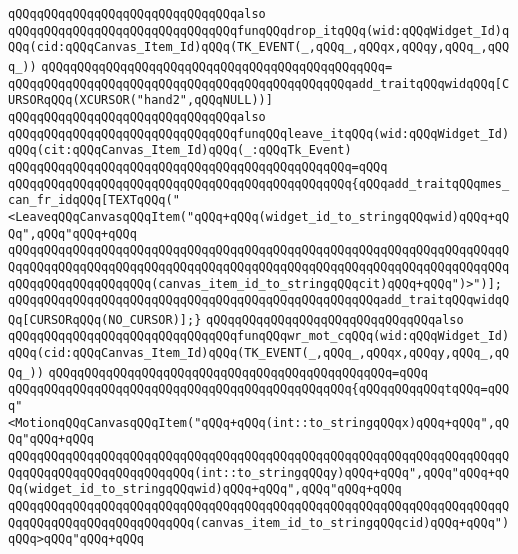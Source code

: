 \verb|qQQqqQQqqQQqqQQqqQQqqQQqqQQqqQQqalso|\newline
\verb|qQQqqQQqqQQqqQQqqQQqqQQqqQQqqQQqfunqQQqdrop_itqQQq(wid:qQQqWidget_Id)qQQq(cid:qQQqCanvas_Item_Id)qQQq(TK_EVENT(_,qQQq_,qQQqx,qQQqy,qQQq_,qQQq_))|\newline
\verb|qQQqqQQqqQQqqQQqqQQqqQQqqQQqqQQqqQQqqQQqqQQqqQQq=|\newline
\verb|qQQqqQQqqQQqqQQqqQQqqQQqqQQqqQQqqQQqqQQqqQQqqQQqadd_traitqQQqwidqQQq[CURSORqQQq(XCURSOR("hand2",qQQqNULL))]|\newline
\newline
\verb|qQQqqQQqqQQqqQQqqQQqqQQqqQQqqQQqalso|\newline
\verb|qQQqqQQqqQQqqQQqqQQqqQQqqQQqqQQqfunqQQqleave_itqQQq(wid:qQQqWidget_Id)qQQq(cit:qQQqCanvas_Item_Id)qQQq(_:qQQqTk_Event)|\newline
\verb|qQQqqQQqqQQqqQQqqQQqqQQqqQQqqQQqqQQqqQQqqQQqqQQq=qQQq|\newline
\verb|qQQqqQQqqQQqqQQqqQQqqQQqqQQqqQQqqQQqqQQqqQQqqQQq{qQQqadd_traitqQQqmes_can_fr_idqQQq[TEXTqQQq("<LeaveqQQqCanvasqQQqItem("qQQq+qQQq(widget_id_to_stringqQQqwid)qQQq+qQQq",qQQq"qQQq+qQQq|\newline
\verb|qQQqqQQqqQQqqQQqqQQqqQQqqQQqqQQqqQQqqQQqqQQqqQQqqQQqqQQqqQQqqQQqqQQqqQQqqQQqqQQqqQQqqQQqqQQqqQQqqQQqqQQqqQQqqQQqqQQqqQQqqQQqqQQqqQQqqQQqqQQqqQQqqQQqqQQqqQQqqQQq(canvas_item_id_to_stringqQQqcit)qQQq+qQQq")>")];|\newline
\verb|qQQqqQQqqQQqqQQqqQQqqQQqqQQqqQQqqQQqqQQqqQQqqQQqqQQqadd_traitqQQqwidqQQq[CURSORqQQq(NO_CURSOR)];}|\newline
\newline
\verb|qQQqqQQqqQQqqQQqqQQqqQQqqQQqqQQqalso|\newline
\verb|qQQqqQQqqQQqqQQqqQQqqQQqqQQqqQQqfunqQQqwr_mot_cqQQq(wid:qQQqWidget_Id)qQQq(cid:qQQqCanvas_Item_Id)qQQq(TK_EVENT(_,qQQq_,qQQqx,qQQqy,qQQq_,qQQq_))|\newline
\verb|qQQqqQQqqQQqqQQqqQQqqQQqqQQqqQQqqQQqqQQqqQQqqQQq=qQQq|\newline
\verb|qQQqqQQqqQQqqQQqqQQqqQQqqQQqqQQqqQQqqQQqqQQqqQQq{qQQqqQQqqQQqtqQQq=qQQq"<MotionqQQqCanvasqQQqItem("qQQq+qQQq(int::to_stringqQQqx)qQQq+qQQq",qQQq"qQQq+qQQq|\newline
\verb|qQQqqQQqqQQqqQQqqQQqqQQqqQQqqQQqqQQqqQQqqQQqqQQqqQQqqQQqqQQqqQQqqQQqqQQqqQQqqQQqqQQqqQQqqQQqqQQq(int::to_stringqQQqy)qQQq+qQQq",qQQq"qQQq+qQQq(widget_id_to_stringqQQqwid)qQQq+qQQq",qQQq"qQQq+qQQq|\newline
\verb|qQQqqQQqqQQqqQQqqQQqqQQqqQQqqQQqqQQqqQQqqQQqqQQqqQQqqQQqqQQqqQQqqQQqqQQqqQQqqQQqqQQqqQQqqQQqqQQq(canvas_item_id_to_stringqQQqcid)qQQq+qQQq")qQQq>qQQq"qQQq+qQQq|\newline
